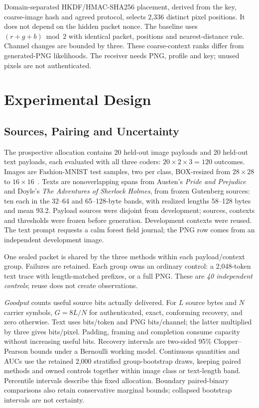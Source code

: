 \documentclass[orivec]{llncs}
\begin{document}
Domain-separated HKDF/HMAC-SHA256 placement, derived from the key, coarse-image hash and agreed protocol, selects 2,336 distinct pixel positions. It does not depend on the hidden packet nonce. The baseline uses $(r+g+b)\bmod2$ with identical packet, positions and nearest-distance rule. Channel changes are bounded by three. These coarse-context ranks differ from generated-PNG likelihoods. The receiver needs PNG, profile and key; unused pixels are not authenticated.

\section{Experimental Design}
\subsection{Sources, Pairing and Uncertainty}
The prospective allocation contains 20 held-out image payloads and 20 held-out text payloads, each evaluated with all three coders: $20\times2\times3=120$ outcomes. Images are Fashion-MNIST test samples, two per class, BOX-resized from $28\times28$ to $16\times16$~\cite{fashion}. Texts are nonoverlapping spans from Austen's \emph{Pride and Prejudice} and Doyle's \emph{The Adventures of Sherlock Holmes}, from frozen Gutenberg sources: ten each in the 32--64 and 65--128-byte bands, with realized lengths 58--128 bytes and mean 93.2. Payload sources were disjoint from development; sources, contexts and thresholds were frozen before generation. Development contexts were reused. The text prompt requests a calm forest field journal; the PNG row comes from an independent development image.

One sealed packet is shared by the three methods within each payload/context group. Failures are retained. Each group owns an ordinary control: a 2,048-token text trace with length-matched prefixes, or a full PNG. These are \emph{40 independent controls}; reuse does not create observations.

\emph{Goodput} counts useful source bits actually delivered. For $L$ source bytes and $N$ carrier symbols, $G=8L/N$ for authenticated, exact, conforming recovery, and zero otherwise. Text uses bits/token and PNG bits/channel; the latter multiplied by three gives bits/pixel. Padding, framing and completion consume capacity without increasing useful bits. Recovery intervals are two-sided 95\% Clopper--Pearson bounds under a Bernoulli working model. Continuous quantities and AUCs use the retained 2,000 stratified group-bootstrap draws, keeping paired methods and owned controls together within image class or text-length band. Percentile intervals describe this fixed allocation. Boundary paired-binary comparisons also retain conservative marginal bounds; collapsed bootstrap intervals are not certainty.
\end{document}

